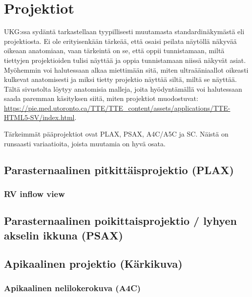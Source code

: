 \documentclass[
]{book}
\begin{document}
\chapter{Projektiot}\label{projektiot}

UKG:ssa sydäntä tarkastellaan tyypillisesti muutamasta standardinäkymästä eli projektiosta. Ei ole erityisenkään tärkeää, että osaisi peilata näytöllä näkyvää oikeaan anatomiaan, vaan tärkeintä on se, että oppii tunnistamaan, miltä tiettyjen projektioiden tulisi näyttää ja oppia tunnistamaan niissä näkyvät asiat. Myöhemmin voi halutessaan alkaa miettimään sitä, miten ultraääniaallot oikeasti kulkevat anatomisesti ja miksi tietty projektio näyttää siltä, miltä se näyttää. Tältä sivustolta löytyy anatomisia malleja, joita hyödyntämällä voi halutessaan saada paremman käsityksen siitä, miten projektiot muodostuvat: \url{https://pie.med.utoronto.ca/TTE/TTE_content/assets/applications/TTE-HTML5-SV/index.html}.

Tärkeimmät pääprojektiot ovat PLAX, PSAX, A4C/A5C ja SC. Näistä on runsaasti variaatioita, joista muutamia on hyvä osata.

\section{Parasternaalinen pitkittäisprojektio (PLAX)}\label{parasternaalinen-pitkittuxe4isprojektio-plax}

\subsection{RV inflow view}\label{rv-inflow-view}

\section{Parasternaalinen poikittaisprojektio / lyhyen akselin ikkuna (PSAX)}\label{parasternaalinen-poikittaisprojektio-lyhyen-akselin-ikkuna-psax}

\section{Apikaalinen projektio (Kärkikuva)}\label{apikaalinen-projektio-kuxe4rkikuva}

\subsection{Apikaalinen nelilokerokuva (A4C)}\label{apikaalinen-nelilokerokuva-a4c}
\end{document}
